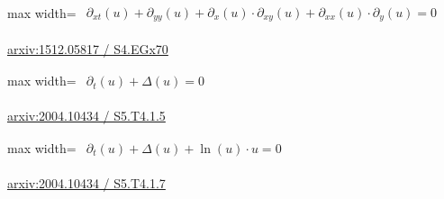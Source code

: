 \documentclass[10pt,a4paper]{article}
\begin{document}
\begin{minipage}{\linewidth}
\begin{center}\begin{adjustbox}{max width=\linewidth}$\displaystyle\begin{gathered}\begin{gathered}\partial_{xt}(u)+\partial_{yy}(u)+\partial_{x}(u)\cdot \partial_{xy}(u)+\partial_{xx}(u)\cdot \partial_{y}(u)=0\end{gathered}\end{gathered}$\end{adjustbox}\end{center}
{\small \href{https://arxiv.org/html/1512.05817#S4.EGx70}{arxiv:1512.05817 / S4.EGx70}}\par
\end{minipage}\par\vspace{7mm}

\begin{minipage}{\linewidth}
\begin{center}\begin{adjustbox}{max width=\linewidth}$\displaystyle\begin{gathered}\begin{gathered}\partial_{t}(u)+\Delta(u)=0\end{gathered}\end{gathered}$\end{adjustbox}\end{center}
{\small \href{https://arxiv.org/html/2004.10434#S5.T4.1.5}{arxiv:2004.10434 / S5.T4.1.5}}\par
\end{minipage}\par\vspace{7mm}

\begin{minipage}{\linewidth}
\begin{center}\begin{adjustbox}{max width=\linewidth}$\displaystyle\begin{gathered}\begin{gathered}\partial_{t}(u)+\Delta(u)+\ln(u)\cdot u=0\end{gathered}\end{gathered}$\end{adjustbox}\end{center}
{\small \href{https://arxiv.org/html/2004.10434#S5.T4.1.7}{arxiv:2004.10434 / S5.T4.1.7}}\par
\end{minipage}\par\vspace{7mm}
\end{document}
